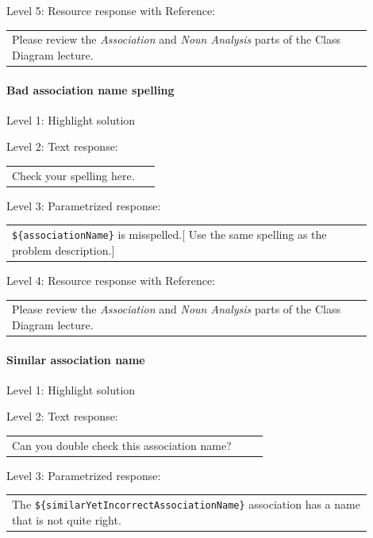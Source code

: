 \noindent Level 5: Resource response with Reference: \medskip

\begin{tabular}{|p{0.9\linewidth}}
Please review the \textit{Association} and \textit{Noun Analysis} parts of the Class Diagram lecture.
\end{tabular} \medskip


\paragraph{Bad association name spelling}

\noindent Level 1: Highlight solution \medskip

\noindent Level 2: Text response: \medskip

\begin{tabular}{|p{0.9\linewidth}}
Check your spelling here.
\end{tabular} \medskip

\noindent Level 3: Parametrized response: \medskip

\begin{tabular}{|p{0.9\linewidth}}
\verb|${associationName}| is misspelled.[ Use the same spelling as the problem description.]
\end{tabular} \medskip

\noindent Level 4: Resource response with Reference: \medskip

\begin{tabular}{|p{0.9\linewidth}}
Please review the \textit{Association} and \textit{Noun Analysis} parts of the Class Diagram lecture.
\end{tabular} \medskip


\paragraph{Similar association name}

\noindent Level 1: Highlight solution \medskip

\noindent Level 2: Text response: \medskip

\begin{tabular}{|p{0.9\linewidth}}
Can you double check this association name?
\end{tabular} \medskip

\noindent Level 3: Parametrized response: \medskip

\begin{tabular}{|p{0.9\linewidth}}
The \verb|${similarYetIncorrectAssociationName}| association has a name that is not quite right.
\end{tabular} \medskip

